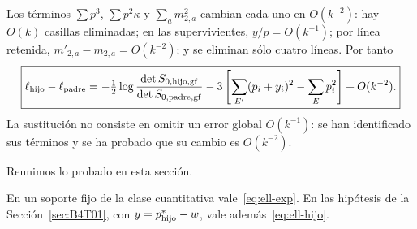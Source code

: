 Los términos $\sum p^3$, $\sum p^2\kappa$ y $\sum_a m_{2,a}^2$
cambian cada uno en $O(k^{-2})$: hay $O(k)$ casillas eliminadas;
en las supervivientes, $y/p=O(k^{-1})$; por línea retenida,
$m'_{2,a}-m_{2,a}=O(k^{-2})$; y se eliminan sólo cuatro líneas.
Por tanto
\begin{equation}\label{eq:ell-hijo}
 \boxed{\ell_{\rm hijo}-\ell_{\rm padre}
 =-\tfrac12\log\frac{\det S_{0,\rm hijo,gf}}{\det S_{0,\rm padre,gf}}
 -3\left[\sum_{E'}(p_i+y_i)^2-\sum_Ep_i^2\right]+O(k^{-2}).}
\end{equation}
La sustitución no consiste en omitir un error global $O(k^{-1})$:
se han identificado sus términos y se ha probado que su cambio es $O(k^{-2})$.

Reunimos lo probado en esta sección.
\begin{lemasub}\label{lem:prefactor}
En un soporte fijo de la clase cuantitativa vale~\eqref{eq:ell-exp}. En las hipótesis de la
Sección~\ref{sec:B4T01}, con $y=p^*_{\rm hijo}-w$, vale además~\eqref{eq:ell-hijo}.
\end{lemasub}
